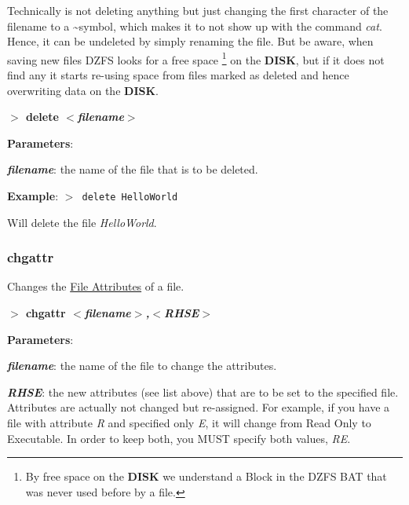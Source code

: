         Technically is not deleting anything but just changing the first
        character of the filename to a \textasciitilde symbol, which makes it to
        not show up with the command \textit{cat}. Hence, it can be undeleted by
        simply renaming the file. But be aware, when saving new files DZFS looks
        for a free space \footnote{By free space on the \textbf{DISK} we
        understand a Block in the DZFS BAT that was never used before by a
        file.} on the \textbf{DISK}, but if it does not find any it starts
        re-using space from files marked as deleted and hence overwriting data
        on the \textbf{DISK}.

        \hspace{1.9cm}\textbf{$>$ delete \textit{$<$filename$>$}}

        \textbf{Parameters}:

        \hspace{1cm}\textbf{\textit{filename}}: the name of the file that is to
        be deleted.
        
        \textbf{Example}: \texttt{$>$ delete HelloWorld}

        Will delete the file \textit{HelloWorld}.

        \subsubsection{{chgattr}}
        \label{cmd:chgattr}

        Changes the \hyperref[subsub:fileattr]{File Attributes} of a file.

        \hspace{1.9cm}\textbf{$>$ chgattr \textit{$<$filename$>$,$<$RHSE$>$}}

        \textbf{Parameters}:

        \hspace{1cm}\textbf{\textit{filename}}: the name of the file to change
        the attributes.

        \hspace{1cm}\textbf{\textit{RHSE}}: the new attributes (see list above)
        that are to be set to the specified file. Attributes are actually not
        changed but re-assigned. For example, if you have a file with attribute
        \textit{R} and specified only \textit{E}, it will change from Read Only
        to Executable. In order to keep both, you MUST specify both values,
        \textit{RE}.
        
